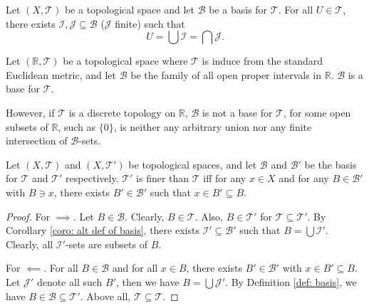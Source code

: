 \begin{corollary}
	\label{coro: alt def of basis}
	Let $(X, \mathcal T)$ be a topological space and let $\mathcal B$ be a basis for $\mathcal T$. For all $U \in \mathcal T$, there exists $\mathcal I, \mathcal J \subseteq \mathcal B$ ($\mathcal J$ finite) such that
	$$
	U = \bigcup \mathcal I = \bigcap \mathcal J.
	$$
\end{corollary}


\begin{example}
	Let $(\mathbb R, \mathcal T)$ be a topological space where $\mathcal T$ is induce from the standard Euclidean metric, and let $\mathcal B$ be the family of all open proper intervals in $\mathbb R$. $\mathcal B$ is a base for $\mathcal T$.
	
	However, if $\mathcal T$ is a discrete topology on $\mathbb R$, $\mathcal B$ is not a base for $\mathcal T$, for some open subsets of $\mathbb R$, such as $\{0\}$, is neither any arbitrary union nor any finite intersection of $\mathcal B$-sets.
\end{example}


\begin{theorem}
	Let $(X, \mathcal T)$ and $(X, \mathcal T')$ be topological spaces, and let $\mathcal B$ and $\mathcal B'$ be the basis for $\mathcal T$ and $\mathcal T'$ respectively. $\mathcal T'$ is finer than $\mathcal T$ iff for any $x \in X$ and for any $B \in \mathcal B'$ with $B \ni x$, there exists $B' \in \mathcal B'$ such that $x \in B' \subseteq B$.
	
	\begin{proof}	
		For $\implies$. Let $B \in \mathcal B$. Clearly, $B \in \mathcal T$. Also, $B \in \mathcal T'$ for $\mathcal T \subseteq \mathcal T'$. By Corollary \ref{coro: alt def of basis}, there exists $\mathcal I' \subseteq \mathcal B'$ such that $B = \bigcup \mathcal I'$. Clearly, all $\mathcal I'$-sets are subsets of $B$.
		
		For $\impliedby$. For all $B \in \mathcal B$ and for all $x \in B$, there exists $B' \in \mathcal B'$ with $x \in B' \subseteq B$. Let $\mathcal J'$ denote all such $B'$, then we have $B = \bigcup \mathcal J'$. By Definition \ref{def: basis}, we have $B \in \mathcal B \subseteq \mathcal T'$. Above all, $\mathcal T \subseteq \mathcal T$.
	\end{proof}
\end{theorem}





